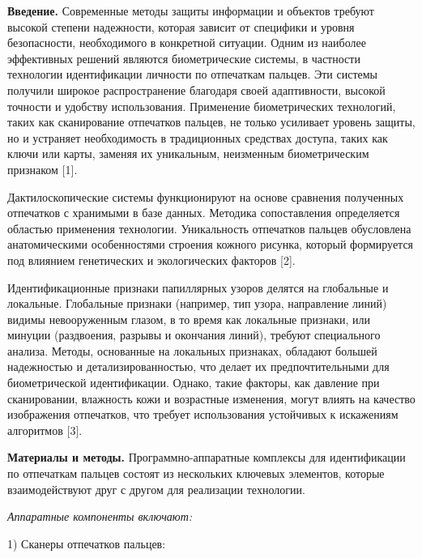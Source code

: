 \begin{multicols}{2}
{\bfseries Введение.} Современные методы защиты информации и объектов
требуют высокой степени надежности, которая зависит от специфики и
уровня безопасности, необходимого в конкретной ситуации. Одним из
наиболее эффективных решений являются биометрические системы, в
частности технологии идентификации личности по отпечаткам пальцев. Эти
системы получили широкое распространение благодаря своей адаптивности,
высокой точности и удобству использования. Применение биометрических
технологий, таких как сканирование отпечатков пальцев, не только
усиливает уровень защиты, но и устраняет необходимость в традиционных
средствах доступа, таких как ключи или карты, заменяя их уникальным,
неизменным биометрическим признаком {[}1{]}.

Дактилоскопические системы функционируют на основе сравнения полученных
отпечатков с хранимыми в базе данных. Методика сопоставления
определяется областью применения технологии. Уникальность отпечатков
пальцев обусловлена анатомическими особенностями строения кожного
рисунка, который формируется под влиянием генетических и экологических
факторов {[}2{]}.

Идентификационные признаки папиллярных узоров делятся на глобальные и
локальные. Глобальные признаки (например, тип узора, направление линий)
видимы невооруженным глазом, в то время как локальные признаки, или
минуции (раздвоения, разрывы и окончания линий), требуют специального
анализа. Методы, основанные на локальных признаках, обладают большей
надежностью и детализированностью, что делает их предпочтительными для
биометрической идентификации. Однако, такие факторы, как давление при
сканировании, влажность кожи и возрастные изменения, могут влиять на
качество изображения отпечатков, что требует использования устойчивых к
искажениям алгоритмов {[}3{]}.

{\bfseries Материалы и методы.} Программно-аппаратные комплексы для
идентификации по отпечаткам пальцев состоят из нескольких ключевых
элементов, которые взаимодействуют друг с другом для реализации
технологии.

\emph{Аппаратные компоненты включают:}

1) Сканеры отпечатков пальцев:


\end{multicols}
